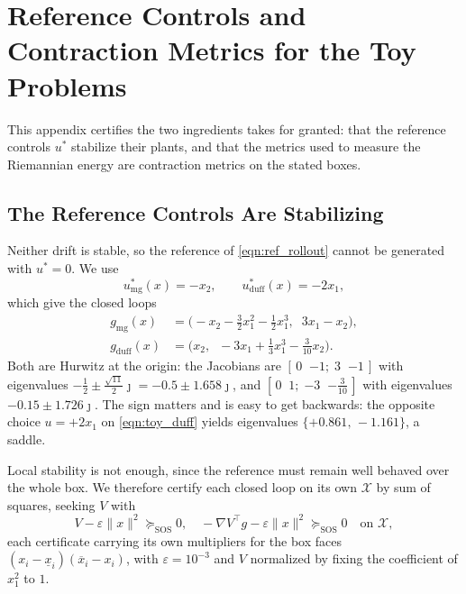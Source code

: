 \documentclass[lettersize,journal]{IEEEtran}
\begin{document}

\section{Reference Controls and Contraction Metrics for the Toy Problems}
\label{app:proof_toy_problems}

This appendix certifies the two ingredients  takes for granted:
that the reference controls $u^*$ stabilize their plants, and that the metrics
used to measure the Riemannian energy are contraction metrics on the stated
boxes.

\subsection{The Reference Controls Are Stabilizing}
Neither drift is stable, so the reference of \eqref{eqn:ref_rollout} cannot be
generated with $u^* = 0$. We use
\begin{equation}\label{eqn:toy_ustar}
    u^*_{\mathrm{mg}}(x) = -x_2,
    \qquad
    u^*_{\mathrm{duff}}(x) = -2x_1,
\end{equation}
which give the closed loops
\begin{equation}\label{eqn:toy_cl}
\begin{aligned}
    g_{\mathrm{mg}}(x) &=
    \bigl(-x_2 - \tfrac{3}{2}x_1^2 - \tfrac{1}{2}x_1^3,\;\; 3x_1 - x_2\bigr), \\
    g_{\mathrm{duff}}(x) &=
    \bigl(x_2,\;\; -3x_1 + \tfrac{1}{3}x_1^3 - \tfrac{3}{10}x_2\bigr).
\end{aligned}
\end{equation}
Both are Hurwitz at the origin: the Jacobians are
$[\,0\;\;{-1};\;3\;\;{-1}\,]$ with eigenvalues
$-\tfrac{1}{2} \pm \tfrac{\sqrt{11}}{2}\jmath = -0.5 \pm 1.658\jmath$, and
$[\,0\;\;1;\;{-3}\;\;{-\tfrac{3}{10}}\,]$ with eigenvalues
$-0.15 \pm 1.726\jmath$. The sign matters and is easy to get backwards: the
opposite choice $u = +2x_1$ on \eqref{eqn:toy_duff} yields eigenvalues
$\{+0.861,\,-1.161\}$, a saddle.

Local stability is not enough, since the reference must remain well behaved over
the whole box. We therefore certify each closed loop on its own $\mathcal{X}$ by
sum of squares, seeking $V$ with
\begin{equation}\label{eqn:toy_lyap_prog}
    V - \varepsilon\|x\|^2 \succeq_{\mathrm{SOS}} 0,
    \quad
    -\nabla V^\top g - \varepsilon\|x\|^2 \succeq_{\mathrm{SOS}} 0
    \quad\text{on } \mathcal{X},
\end{equation}
each certificate carrying its own multipliers for the box faces
$(x_i - \underline{x}_i)(\overline{x}_i - x_i)$, with $\varepsilon = 10^{-3}$
and $V$ normalized by fixing the coefficient of $x_1^2$ to $1$.
\end{document}
